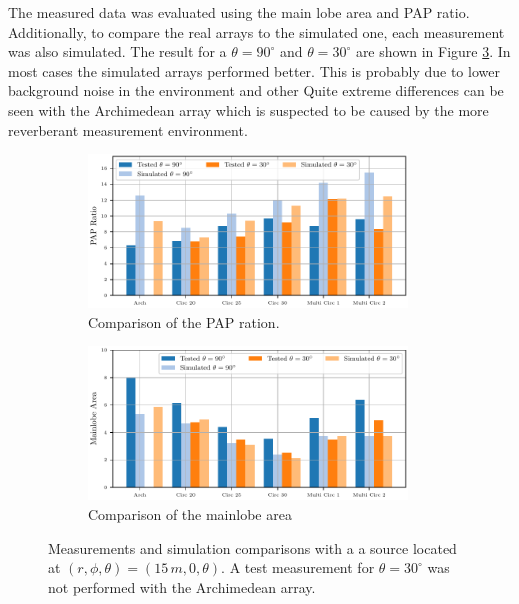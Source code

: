 The measured data was evaluated using the main lobe area and PAP ratio.
Additionally, to compare the real arrays to the simulated one, each measurement
was also simulated.
The result for a $\theta = 90^\circ$ and $\theta = 30^\circ$ are shown in
Figure \ref{fig:TestSim}.
In most cases the simulated arrays performed better.
This is probably due to lower background noise in the environment and other
Quite extreme differences can be seen with the Archimedean array which is
suspected to be caused by the more reverberant measurement environment.

\begin{figure}[ht]
	\centering
	\begin{subfigure}[b]{1\textwidth}
		\centering
		\includegraphics[width=0.93\textwidth]{images/5_array_evaluation/PapTestSim.pdf}
		\caption{Comparison of the PAP ration.}
		\label{fig:comp1}
	\end{subfigure}
	\begin{subfigure}[b]{1\textwidth}
		\centering
		\includegraphics[width=0.93\textwidth]{images/5_array_evaluation/AreaTestSim.pdf}
		\caption{Comparison of the mainlobe area}
		\label{fig:comp2}
	\end{subfigure}
	\caption{Measurements and simulation comparisons with a a source located at $(r, \phi, \theta) = (15\,m, 0, \theta)$.
		A test measurement for $\theta = 30^\circ$ was not performed with the Archimedean array.}
	\label{fig:TestSim}
\end{figure}


